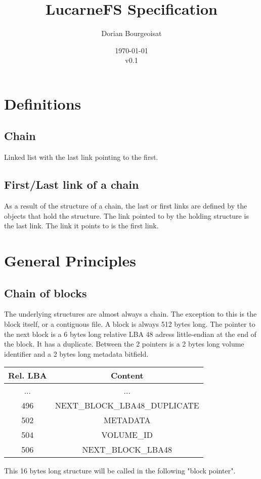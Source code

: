\documentclass{article}
\title{LucarneFS Specification}
\author{Dorian Bourgeoisat}
\date{\today\\v0.1}
\begin{document}
\maketitle
\newpage
\tableofcontents

\newpage
\section{Definitions}
\subsection{Chain}
Linked list with the last link pointing to the first.
\subsection{First/Last link of a chain}
As a result of the structure of a chain, the last or first links are defined by the objects that hold the structure. The link pointed to by the holding structure is the last link. The link it points to is the first link.

\section{General Principles}
\subsection{Chain of blocks}
The underlying structures are almost always a chain. The exception to this is the block itself, or a contiguous file. A block is always 512 bytes long.\newline
The pointer to the next block is a 6 bytes long relative LBA 48 adress little-endian at the end of the block. It has a duplicate. Between the 2 pointers is a 2 bytes long volume identifier and a 2 bytes long metadata bitfield.

\begin{tabular}{|c|c|}
    \hline
    Rel. LBA & Content \\
    \hline
    ... & ...  \\
    \hline
    496 & NEXT\_BLOCK\_LBA48\_DUPLICATE \\
    \hline
    502 & METADATA  \\
    \hline
    504 & VOLUME\_ID  \\
    \hline
    506 & NEXT\_BLOCK\_LBA48  \\
    \hline
\end{tabular}
\newline
This 16 bytes long structure will be called in the following "block pointer".
\end{document}
